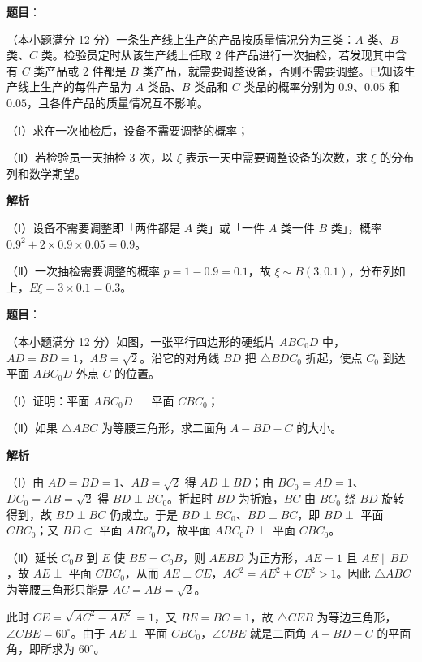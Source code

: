 \begin{answer}

\textbf{题目}：

（本小题满分 12 分）一条生产线上生产的产品按质量情况分为三类：$A$ 类、$B$ 类、$C$ 类。检验员定时从该生产线上任取 $2$ 件产品进行一次抽检，若发现其中含有 $C$ 类产品或 $2$ 件都是 $B$ 类产品，就需要调整设备，否则不需要调整。已知该生产线上生产的每件产品为 $A$ 类品、$B$ 类品和 $C$ 类品的概率分别为 $0.9$、$0.05$ 和 $0.05$，且各件产品的质量情况互不影响。

（Ⅰ）求在一次抽检后，设备不需要调整的概率；

（Ⅱ）若检验员一天抽检 $3$ 次，以 $\xi$ 表示一天中需要调整设备的次数，求 $\xi$ 的分布列和数学期望。

\textbf{解析}

（Ⅰ）设备不需要调整即「两件都是 $A$ 类」或「一件 $A$ 类一件 $B$ 类」，概率 $0.9^2+2\times0.9\times0.05=0.9$。

（Ⅱ）一次抽检需要调整的概率 $p=1-0.9=0.1$，故 $\xi\sim B(3,0.1)$，分布列如上，$E\xi=3\times0.1=0.3$。


\end{answer}
\begin{answer}

\textbf{题目}：

（本小题满分 12 分）如图，一张平行四边形的硬纸片 $ABC_0D$ 中，$AD=BD=1$，$AB=\sqrt2$。沿它的对角线 $BD$ 把 $\triangle BDC_0$ 折起，使点 $C_0$ 到达平面 $ABC_0D$ 外点 $C$ 的位置。

（Ⅰ）证明：平面 $ABC_0D\perp$ 平面 $CBC_0$；

（Ⅱ）如果 $\triangle ABC$ 为等腰三角形，求二面角 $A-BD-C$ 的大小。
\nopagebreak[4]
\begin{center}\end{center}
\nopagebreak[4]
\textbf{解析}

（Ⅰ）由 $AD=BD=1$、$AB=\sqrt2$ 得 $AD\perp BD$；由 $BC_0=AD=1$、$DC_0=AB=\sqrt2$ 得 $BD\perp BC_0$。折起时 $BD$ 为折痕，$BC$ 由 $BC_0$ 绕 $BD$ 旋转得到，故 $BD\perp BC$ 仍成立。于是 $BD\perp BC_0$、$BD\perp BC$，即 $BD\perp$ 平面 $CBC_0$；又 $BD\subset$ 平面 $ABC_0D$，故平面 $ABC_0D\perp$ 平面 $CBC_0$。

（Ⅱ）延长 $C_0B$ 到 $E$ 使 $BE=C_0B$，则 $AEBD$ 为正方形，$AE=1$ 且 $AE\parallel BD$，故 $AE\perp$ 平面 $CBC_0$，从而 $AE\perp CE$，$AC^2=AE^2+CE^2>1$。因此 $\triangle ABC$ 为等腰三角形只能是 $AC=AB=\sqrt2$。

此时 $CE=\sqrt{AC^2-AE^2}=1$，又 $BE=BC=1$，故 $\triangle CEB$ 为等边三角形，$\angle CBE=60^\circ$。由于 $AE\perp$ 平面 $CBC_0$，$\angle CBE$ 就是二面角 $A-BD-C$ 的平面角，即所求为 $60^\circ$。


\end{answer}

